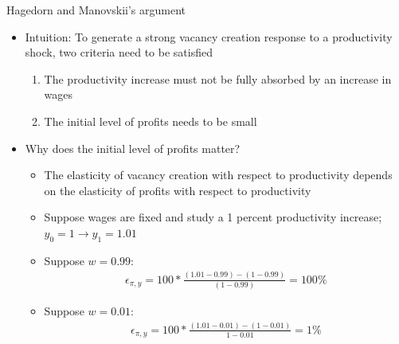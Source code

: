 \documentclass[9pt]{beamer}
\newcommand{\bit}{\begin{itemize}}
\newcommand{\eit}{\end{itemize}}
\newcommand{\ben}{\begin{enumerate}}
\newcommand{\een}{\end{enumerate}}
\begin{document}
\begin{frame}{Hagedorn and Manovskii's argument}

\bit
\setlength\itemsep{1.5em}

\item Intuition: To generate a strong vacancy creation response to a productivity shock, two criteria need to be satisfied
\ben
\setlength\itemsep{0.5em}
\item The productivity increase must not be fully absorbed by an increase in wages 

\item The initial level of profits needs to be small
\een

\item Why does the initial level of profits matter?
\bit
\setlength\itemsep{0.5em}
\item The elasticity of vacancy creation with respect to productivity depends on the elasticity of profits with respect to productivity

\item Suppose wages are fixed and study a 1 percent productivity increase; $y_0=1 \rightarrow y_1 = 1.01$
\item Suppose $w=0.99$:
\begin{eqnarray}
\epsilon_{\pi, y} = 100*\frac{(1.01-0.99)-(1-0.99)}{(1-0.99)}= 100 \% \nonumber
\end{eqnarray}
\item Suppose $w=0.01$:
\begin{eqnarray}
\epsilon_{\pi, y} = 100*\frac{(1.01-0.01)-(1-0.01)}{1-0.01}= 1 \% \nonumber
\end{eqnarray}	
\eit


\eit
\end{frame}
\end{document}
